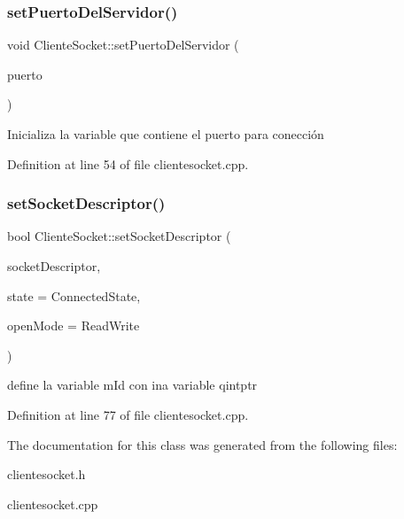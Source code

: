 \subsubsection{\texorpdfstring{set\+Puerto\+Del\+Servidor()}{setPuertoDelServidor()}}
{\footnotesize\ttfamily void Cliente\+Socket\+::set\+Puerto\+Del\+Servidor (\begin{DoxyParamCaption}\item[{quint16}]{puerto }\end{DoxyParamCaption})}

Inicializa la variable que contiene el puerto para conección 

Definition at line 54 of file clientesocket.\+cpp.

\mbox{\label{class_cliente_socket_af8e9fa96a8f3a2207f34b26c74d53de9}} 
\subsubsection{\texorpdfstring{set\+Socket\+Descriptor()}{setSocketDescriptor()}}
{\footnotesize\ttfamily bool Cliente\+Socket\+::set\+Socket\+Descriptor (\begin{DoxyParamCaption}\item[{qintptr}]{socket\+Descriptor,  }\item[{Socket\+State}]{state = {\ttfamily ConnectedState},  }\item[{Open\+Mode}]{open\+Mode = {\ttfamily ReadWrite} }\end{DoxyParamCaption})\hspace{0.3cm}{\ttfamily [override]}}

define la variable m\+Id con ina variable qintptr 

Definition at line 77 of file clientesocket.\+cpp.



The documentation for this class was generated from the following files\+:\begin{DoxyCompactItemize}
\item 
clientesocket.\+h\item 
clientesocket.\+cpp\end{DoxyCompactItemize}
